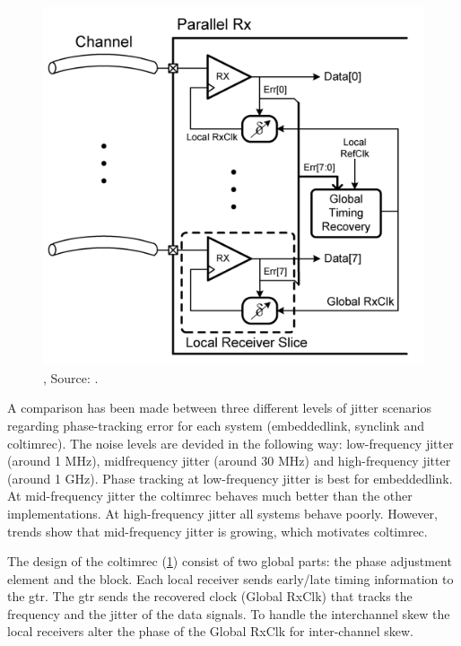 \begin{figure}
    \centering
	\includegraphics[width=0.85\linewidth]{Figures/Rep1CombLink.png}
	\caption{, Source: \cite{agrawal20098}.} 
    \label{fig:rep1:coltimrec}
\end{figure}

A comparison has been made between three different levels of jitter scenarios regarding phase-tracking error for each system (\ac{embeddedlink}, \ac{synclink} and \ac{coltimrec}). %
The noise levels are devided in the following way: low-frequency jitter (around 1 MHz), midfrequency jitter (around 30 MHz) and high-frequency jitter (around 1 GHz).
Phase tracking at low-frequency jitter is best for \ac{embeddedlink}. 
At mid-frequency jitter the \ac{coltimrec} behaves much better than the other implementations. 
At high-frequency jitter all systems behave poorly.
However, trends show that mid-frequency jitter is growing, which motivates \ac{coltimrec}.

The design of the \ac{coltimrec} (\cref{fig:rep1:coltimrec}) consist of two global parts: the phase adjustment element and the  block.
Each local receiver sends early/late timing information to the \ac{gtr}.
The \ac{gtr} sends the recovered clock (Global RxClk) that tracks the frequency and the jitter of the data signals.
To handle the interchannel skew the local receivers alter the phase of the Global RxClk for inter-channel skew.

